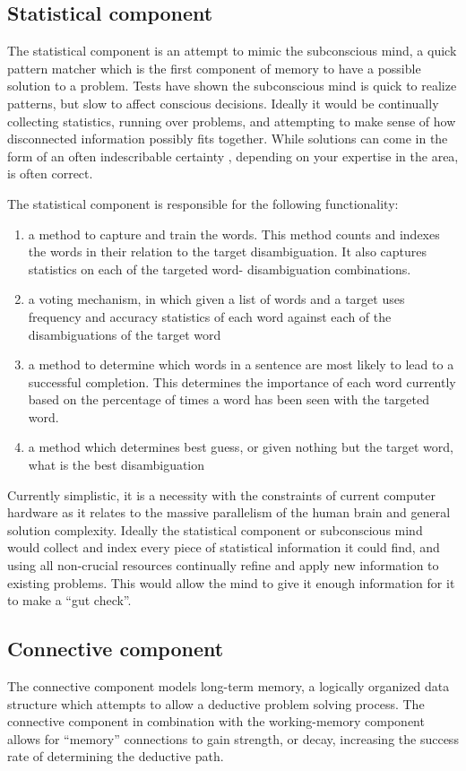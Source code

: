 \subsection{Statistical component} The statistical component is an attempt to
mimic the subconscious mind, a quick pattern matcher which is the first
component of memory to have a possible solution to a problem.  Tests have shown
\cite{BLINK} the subconscious mind is quick to realize patterns, but slow to
affect conscious decisions. Ideally it would be continually collecting
statistics, running over problems, and attempting to make sense of how
disconnected information possibly fits together.  While solutions can come in
the form of an often indescribable certainty \cite{BLINK}, depending on your
expertise in the area, is often correct.

The statistical component is responsible for the following functionality:

\begin{enumerate}     \item a method to capture and train the words.  This
method counts and indexes the words in their relation to the target
disambiguation. It also captures statistics on each of the targeted word-
disambiguation combinations.     \item a voting mechanism, in which given a list
of words and a target uses frequency and accuracy statistics of each word
against each of the disambiguations of the target word     \item a method to
determine which words in a sentence are most likely to lead to a successful
completion.  This determines the importance of each word currently based on the
percentage of times a word has been seen with the targeted word.     \item a
method which determines best guess, or given nothing but the target word, what
is the best disambiguation \end{enumerate}

Currently simplistic, it is a necessity with the constraints of current computer
hardware as it relates to the massive parallelism of the human brain and general
solution complexity.  Ideally the statistical component or subconscious mind
would collect and index every piece of statistical information it could find,
and using all non-crucial resources continually refine and apply new information
to existing problems.  This would allow the mind to give it enough information
for it to make a ``gut check''.

\subsection{Connective component} The connective component models long-term
memory, a logically organized data structure which attempts to allow a deductive
problem solving process.  The connective component in combination with the
working-memory component allows for ``memory'' connections to gain strength, or
decay, increasing the success rate of determining the deductive path.

